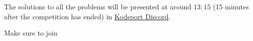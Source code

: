 
The solutions to all the problems will be presented at around $13:15$ (15 minutes after the competition has ended) in \href{https://discord.gg/RstKRP9fvD}{Kodsport Discord}. 

Make sure to join


